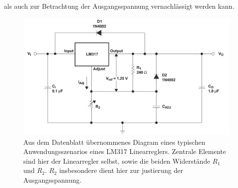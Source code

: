 	als auch zur Betrachtung der Ausgangsspannung vernachlässigt werden kann.
	\begin{figure}[h]
		\centering
		\includegraphics[width=.9\textwidth]{referenzen/typical_app_schem.jpg}
		\caption{Aus dem Datenblatt übernommenes Diagram eines typischen Anwendungsszenarios eines LM317 Linearreglers. Zentrale Elemente sind hier der Linearregler selbst, sowie
		die beiden Widerstände \(R_1\) und \(R_2\). \(R_2\) insbesondere dient hier zur justierung der Ausgangsspannung.}
		\label{fig:typical app sch}
	\end{figure}